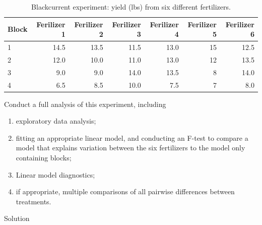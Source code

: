 \documentclass[
]{book}
\providecommand{\tightlist}{%
  \setlength{\itemsep}{0pt}\setlength{\parskip}{0pt}}
\theoremstyle{definition}
\theoremstyle{definition}
\theoremstyle{definition}
\theoremstyle{definition}
\theoremstyle{remark}
\begin{document}
\begin{enumerate}
  \begin{table}

   \caption{\label{tab:blackcurrent-data}Blackcurrent experiment: yield (lbs) from six different fertilizers.}
   \centering
   \begin{tabular}[t]{l|r|r|r|r|r|r}
   \hline
   Block & Ferilizer 1 & Ferilizer 2 & Ferilizer 3 & Ferilizer 4 & Ferilizer 5 & Ferilizer 6\\
   \hline
   1 & 14.5 & 13.5 & 11.5 & 13.0 & 15 & 12.5\\
   \hline
   2 & 12.0 & 10.0 & 11.0 & 13.0 & 12 & 13.5\\
   \hline
   3 & 9.0 & 9.0 & 14.0 & 13.5 & 8 & 14.0\\
   \hline
   4 & 6.5 & 8.5 & 10.0 & 7.5 & 7 & 8.0\\
   \hline
   \end{tabular}
   \end{table}

  Conduct a full analysis of this experiment, including

  \begin{enumerate}
  \def\labelenumii{\alph{enumii}.}
  \tightlist
  \item
    exploratory data analysis;
  \item
    fitting an appropriate linear model, and conducting an F-test to compare a model that explains variation between the six fertilizers to the model only containing blocks;
  \item
    Linear model diagnostics;
  \item
    if appropriate, multiple comparisons of all pairwise differences between treatments.
  \end{enumerate}
\end{enumerate}

Solution
\end{document}
